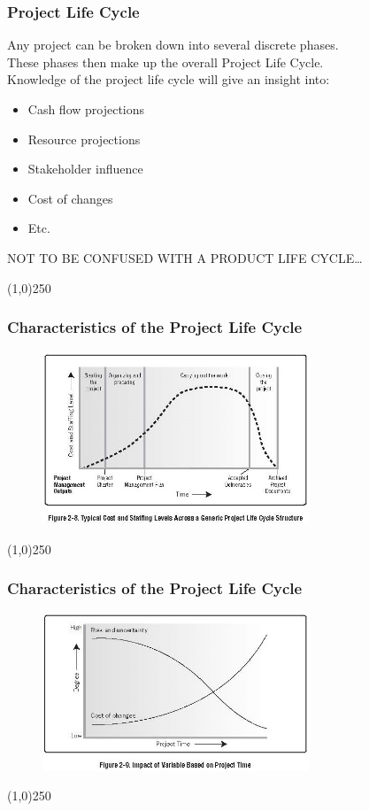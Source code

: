 \begin{frame}
\frametitle{Project Life Cycle}
Any project can be broken down into several discrete phases.\\
These phases then make up the overall Project Life Cycle.\\
Knowledge of the project life cycle will give an insight into:\\
\begin{itemize}
	\item Cash flow projections
	\item Resource projections
	\item Stakeholder influence
	\item Cost of changes
	\item Etc.
\end{itemize}
NOT TO BE CONFUSED WITH A PRODUCT LIFE CYCLE\ldots\\
\end{frame}
\begin{center}\line(1,0){250}\end{center}



\begin{frame}
\frametitle{Characteristics of the Project Life Cycle}
 \begin{figure}
 	\centering
 		\includegraphics[width = 8cm]{images/Fig2-8.jpg}
 	\label{fig:2-8}
 \end{figure}
\end{frame}
\begin{center}\line(1,0){250}\end{center}



\begin{frame}
\frametitle{Characteristics of the Project Life Cycle}
 \begin{figure}
 	\centering
 		\includegraphics[width = 8cm]{images/Fig2-9.jpg}
 	\label{fig:2-9}
 \end{figure}
\end{frame}
\begin{center}\line(1,0){250}\end{center}



